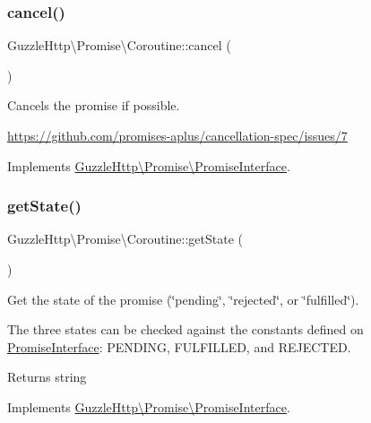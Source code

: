 \subsubsection{\texorpdfstring{cancel()}{cancel()}}
{\footnotesize\ttfamily Guzzle\+Http\textbackslash{}\+Promise\textbackslash{}\+Coroutine\+::cancel (\begin{DoxyParamCaption}{ }\end{DoxyParamCaption})}

Cancels the promise if possible.

\hyperlink{}{https\+://github.\+com/promises-\/aplus/cancellation-\/spec/issues/7}

Implements \hyperlink{interfaceGuzzleHttp_1_1Promise_1_1PromiseInterface_ab3f2eb63d775492446ab3784618aeef8}{Guzzle\+Http\textbackslash{}\+Promise\textbackslash{}\+Promise\+Interface}.

\mbox{\label{classGuzzleHttp_1_1Promise_1_1Coroutine_a67968b964dd78cde69e69267f2f6bc8e}} 
\subsubsection{\texorpdfstring{get\+State()}{getState()}}
{\footnotesize\ttfamily Guzzle\+Http\textbackslash{}\+Promise\textbackslash{}\+Coroutine\+::get\+State (\begin{DoxyParamCaption}{ }\end{DoxyParamCaption})}

Get the state of the promise (\char`\"{}pending\char`\"{}, \char`\"{}rejected\char`\"{}, or \char`\"{}fulfilled\char`\"{}).

The three states can be checked against the constants defined on \hyperlink{interfaceGuzzleHttp_1_1Promise_1_1PromiseInterface}{Promise\+Interface}\+: P\+E\+N\+D\+I\+NG, F\+U\+L\+F\+I\+L\+L\+ED, and R\+E\+J\+E\+C\+T\+ED.

\begin{DoxyReturn}{Returns}
string 
\end{DoxyReturn}


Implements \hyperlink{interfaceGuzzleHttp_1_1Promise_1_1PromiseInterface_a4473485faedc0b6489ff28b4fbdc2330}{Guzzle\+Http\textbackslash{}\+Promise\textbackslash{}\+Promise\+Interface}.

